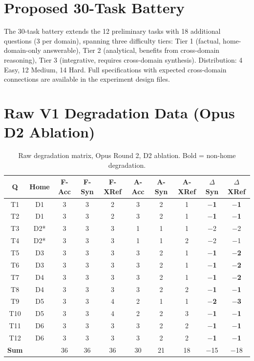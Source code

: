 \documentclass[12pt,letterpaper]{article}
\begin{document}
\section{Proposed 30-Task Battery}
\label{app:battery30}

The 30-task battery extends the 12 preliminary tasks with 18 additional questions (3 per domain), spanning three difficulty tiers: Tier 1 (factual, home-domain-only answerable), Tier 2 (analytical, benefits from cross-domain reasoning), Tier 3 (integrative, requires cross-domain synthesis). Distribution: 4 Easy, 12 Medium, 14 Hard. Full specifications with expected cross-domain connections are available in the experiment design files.

\section{Raw V1 Degradation Data (Opus D2 Ablation)}
\label{app:raw-v1}

\begin{table}[H]
\centering
\small
\caption{Raw degradation matrix, Opus Round 2, D2 ablation. Bold = non-home degradation.}
\label{tab:raw-opus}
\begin{tabular}{cccccccccc}
\toprule
\textbf{Q} & \textbf{Home} & \textbf{F-Acc} & \textbf{F-Syn} & \textbf{F-XRef} & \textbf{A-Acc} & \textbf{A-Syn} & \textbf{A-XRef} & \textbf{$\Delta$Syn} & \textbf{$\Delta$XRef} \\
\midrule
T1 & D1 & 3 & 3 & 2 & 3 & 2 & 1 & \textbf{$-$1} & \textbf{$-$1} \\
T2 & D1 & 3 & 3 & 2 & 3 & 2 & 1 & \textbf{$-$1} & \textbf{$-$1} \\
T3 & D2* & 3 & 3 & 3 & 1 & 1 & 1 & $-$2 & $-$2 \\
T4 & D2* & 3 & 3 & 3 & 1 & 1 & 2 & $-$2 & $-$1 \\
T5 & D3 & 3 & 3 & 3 & 3 & 2 & 1 & \textbf{$-$1} & \textbf{$-$2} \\
T6 & D3 & 3 & 3 & 3 & 3 & 2 & 1 & \textbf{$-$1} & \textbf{$-$2} \\
T7 & D4 & 3 & 3 & 3 & 3 & 2 & 1 & \textbf{$-$1} & \textbf{$-$2} \\
T8 & D4 & 3 & 3 & 3 & 3 & 2 & 2 & \textbf{$-$1} & \textbf{$-$1} \\
T9 & D5 & 3 & 3 & 4 & 2 & 1 & 1 & \textbf{$-$2} & \textbf{$-$3} \\
T10 & D5 & 3 & 3 & 4 & 2 & 2 & 3 & \textbf{$-$1} & \textbf{$-$1} \\
T11 & D6 & 3 & 3 & 3 & 3 & 2 & 2 & \textbf{$-$1} & \textbf{$-$1} \\
T12 & D6 & 3 & 3 & 3 & 3 & 2 & 2 & \textbf{$-$1} & \textbf{$-$1} \\
\midrule
\textbf{Sum} & & 36 & 36 & 36 & 30 & 21 & 18 & $-$15 & $-$18 \\
\bottomrule
\end{tabular}
\end{table}
\end{document}
